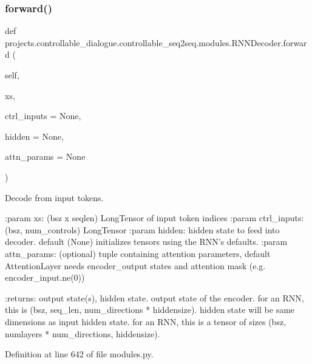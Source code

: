 \subsubsection{\texorpdfstring{forward()}{forward()}}
{\footnotesize\ttfamily def projects.\+controllable\+\_\+dialogue.\+controllable\+\_\+seq2seq.\+modules.\+R\+N\+N\+Decoder.\+forward (\begin{DoxyParamCaption}\item[{}]{self,  }\item[{}]{xs,  }\item[{}]{ctrl\+\_\+inputs = {\ttfamily None},  }\item[{}]{hidden = {\ttfamily None},  }\item[{}]{attn\+\_\+params = {\ttfamily None} }\end{DoxyParamCaption})}

\begin{DoxyVerb}Decode from input tokens.

:param xs:          (bsz x seqlen) LongTensor of input token indices
:param ctrl_inputs: (bsz, num_controls) LongTensor
:param hidden:      hidden state to feed into decoder. default (None)
            initializes tensors using the RNN's defaults.
:param attn_params: (optional) tuple containing attention parameters,
            default AttentionLayer needs encoder_output states
            and attention mask (e.g. encoder_input.ne(0))

:returns:           output state(s), hidden state.
            output state of the encoder. for an RNN, this is
            (bsz, seq_len, num_directions * hiddensize).
            hidden state will be same dimensions as input
            hidden state. for an RNN, this is a tensor of sizes
            (bsz, numlayers * num_directions, hiddensize).
\end{DoxyVerb}
 

Definition at line 642 of file modules.\+py.


